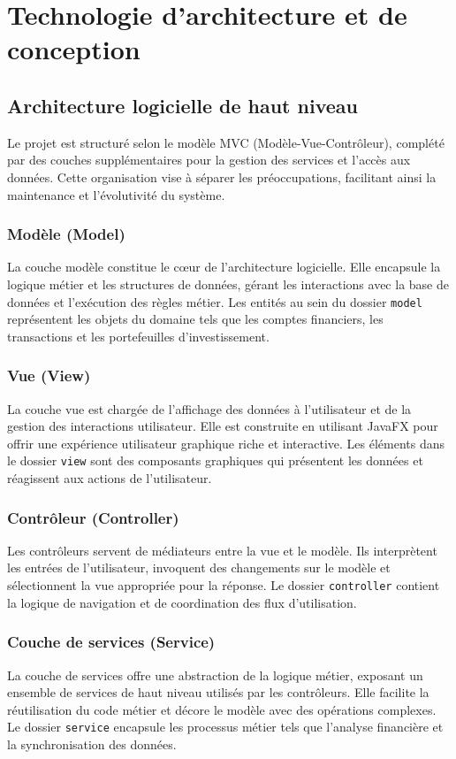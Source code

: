 \documentclass{article}
\begin{document}
\section{Technologie d'architecture et de conception}


\subsection{Architecture logicielle de haut niveau}

Le projet est structuré selon le modèle MVC (Modèle-Vue-Contrôleur), complété par des couches supplémentaires pour la gestion des services et l'accès aux données. Cette organisation vise à séparer les préoccupations, facilitant ainsi la maintenance et l'évolutivité du système.

\subsubsection{Modèle (Model)}
La couche modèle constitue le cœur de l'architecture logicielle. Elle encapsule la logique métier et les structures de données, gérant les interactions avec la base de données et l'exécution des règles métier. Les entités au sein du dossier \texttt{model} représentent les objets du domaine tels que les comptes financiers, les transactions et les portefeuilles d'investissement.

\subsubsection{Vue (View)}
La couche vue est chargée de l'affichage des données à l'utilisateur et de la gestion des interactions utilisateur. Elle est construite en utilisant JavaFX pour offrir une expérience utilisateur graphique riche et interactive. Les éléments dans le dossier \texttt{view} sont des composants graphiques qui présentent les données et réagissent aux actions de l'utilisateur.

\subsubsection{Contrôleur (Controller)}
Les contrôleurs servent de médiateurs entre la vue et le modèle. Ils interprètent les entrées de l'utilisateur, invoquent des changements sur le modèle et sélectionnent la vue appropriée pour la réponse. Le dossier \texttt{controller} contient la logique de navigation et de coordination des flux d'utilisation.

\subsubsection{Couche de services (Service)}
La couche de services offre une abstraction de la logique métier, exposant un ensemble de services de haut niveau utilisés par les contrôleurs. Elle facilite la réutilisation du code métier et décore le modèle avec des opérations complexes. Le dossier \texttt{service} encapsule les processus métier tels que l'analyse financière et la synchronisation des données.
\end{document}

